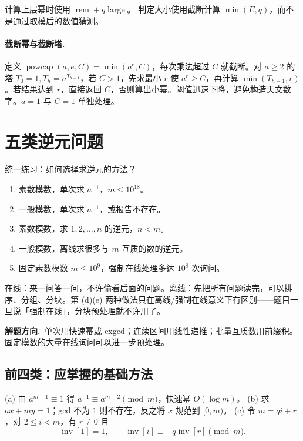 \documentclass[UTF8,a4paper,11pt,twoside,openright,fontset=fandol]{ctexbook}
\theoremstyle{definition}
\newcommand{\hint}{\par\noindent\textbf{解题方向.}\ }
\begin{document}
计算上层幂时使用 $\operatorname{rem}+q\operatorname{large}$。
判定大小使用截断计算 $\min(E,q)$，而不是通过取模后的数值猜测。

\paragraph{截断幂与截断塔.} 定义 $\operatorname{powcap}(a,e,C)=\min(a^e,C)$，每次乘法超过 $C$ 就截断。对 $a\ge2$ 的塔 $T_0=1,T_h=a^{T_{h-1}}$，若 $C>1$，先求最小 $r$ 使 $a^r\ge C$，再计算 $\min(T_{h-1},r)$。若结果达到 $r$，直接返回 $C$，否则算出小幂。阈值迅速下降，避免构造天文数字。$a=1$ 与 $C=1$ 单独处理。


\section{五类逆元问题}
\begin{problem}{统一练习：如何选择求逆元的方法？}
\begin{enumerate}[label=(\alph*)]
\item 素数模数，单次求 $a^{-1}$，$m\le10^{18}$。
\item 一般模数，单次求 $a^{-1}$，或报告不存在。
\item 素数模数，求 $1,2,\ldots,n$ 的逆元，$n<m$。
\item 一般模数，离线求很多与 $m$ 互质的数的逆元。
\item 固定素数模数 $m\le10^9$，强制在线处理多达 $10^8$ 次询问。
\end{enumerate}
\end{problem}

\begin{tip}[在线/离线]
在线：来一问答一问，不许偷看后面的问题。离线：先把所有问题读完，可以排序、分组、分块。第 (d)(e) 两种做法只在离线/强制在线意义下有区别——题目一旦说「强制在线」，分块预处理就不许用了。
\end{tip}

\hint 单次用快速幂或 exgcd；连续区间用线性递推；批量互质数用前缀积。固定模数的大量在线询问可以进一步预处理。


\subsection{前四类：应掌握的基础方法}
(a) 由 $a^{m-1}\equiv1$ 得 $a^{-1}\equiv a^{m-2}\pmod m$，快速幂 $O(\log m)$。
(b) 求 $ax+my=1$；gcd 不为 $1$ 则不存在，反之将 $x$ 规范到 $[0,m)$。
(c) 令 $m=qi+r$，对 $2\le i<m$，有 $r\ne0$ 且
\[
 \operatorname{inv}[1]=1,\qquad
 \operatorname{inv}[i]\equiv-q\operatorname{inv}[r]\pmod m.
\]
\end{document}
